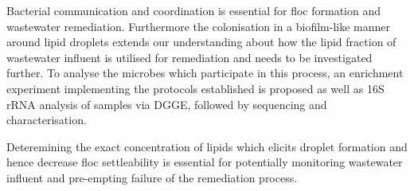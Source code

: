 \documentclass[11pt]{article}
\begin{document}
Bacterial communication and coordination is essential for floc formation and wastewater remediation. Furthermore the colonisation in a biofilm-like manner around lipid droplets extends our understanding about how the lipid fraction of wastewater influent is utilised for remediation and needs to be investigated further. To analyse the microbes which participate in this process, an enrichment experiment implementing the protocols established is proposed as well as 16S rRNA analysis of samples via DGGE, followed by sequencing and characterisation. 

Deteremining the exact concentration of lipids which elicits droplet formation and hence decrease floc settleability is essential for potentially monitoring wastewater influent and pre-empting failure of the remediation process. 
\end{document}
